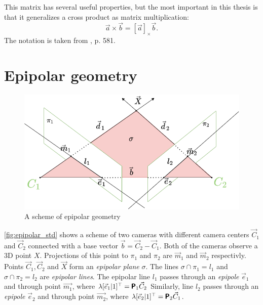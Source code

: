 This matrix has several useful properties, but the most important in this thesis is that it generalizes a cross product as matrix multiplication:
\begin{equation}
    \vec{a} \times \vec{b} = [\vec{a}]_{\times} \vec{b}.
\end{equation}
The notation is taken from \cite{hartley_zisserman_2004}, p. 581.

\section{Epipolar geometry}
\label{sec:epipolar_geometry}
\begin{figure}[h]
    \centering
    \includegraphics[width=\textwidth]{graphics/epipolar.png}
    \caption{A scheme of epipolar geometry}
    \label{fig:epipolar_std}
\end{figure}

\autoref{fig:epipolar_std} shows a scheme of two cameras with different camera centers $\vec{C}_1$ and $\vec{C}_2$ connected with a base vector $\vec{b} = \vec{C}_2 - \vec{C}_1$. 
Both of the cameras observe a 3D point $X$. 
Projections of this point to $\pi_1$ and $\pi_2$ are $\vec{m}_1$ and $\vec{m}_2$ respectivly. 
Points $\vec{C}_1, \vec{C}_2$ and $\vec{X}$ form an \textit{epipolar plane} $\sigma$.
The lines $\sigma \cap \pi_1 = l_1$ and $\sigma \cap \pi_2 = l_2$ are \textit{epipolar lines}. 
The epipolar line $l_1$ passes through an \textit{epipole} $\vec{e}_1$ and through point $\vec{m_1}$, where $\lambda [\vec{e}_1 | 1]^\top = \pmb{\mathsf{P}}_1 \vec{C}_2$
Similarly, line $l_2$ passes through an \textit{epipole} $\vec{e}_2$ and through point $\vec{m_2}$, where $\lambda [\vec{e}_2 | 1]^\top = \pmb{\mathsf{P}}_2 \vec{C}_1$.

